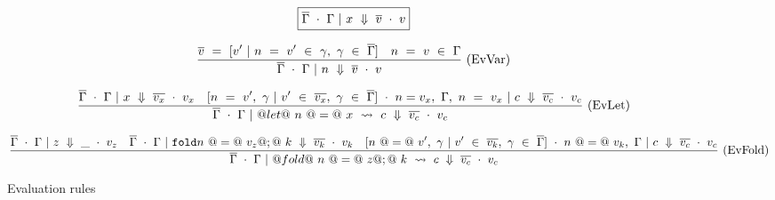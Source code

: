 
\begin{figure*}

$$
\boxed{\overline{\Gamma} ~\cdot~ \Gamma ~|~ x ~\Downarrow~ \overline{v} ~\cdot~ v}
$$


$$
\frac {\displaystyle 
    \overline{v} ~=~ [ v' ~|~ n ~=~ v' ~\in~ \gamma,~ \gamma ~\in~ \overline{\Gamma} ]
    \quad
    n ~=~ v ~\in~ \Gamma
} {\displaystyle  
    \overline{\Gamma} ~\cdot~ \Gamma ~|~ n ~\Downarrow~ \overline{v} ~\cdot~ v
} \ 
\textrm{(EvVar)}
$$

$$
\frac {\displaystyle 
    \overline{\Gamma} ~\cdot~ \Gamma ~|~ x ~\Downarrow~ \overline{v_x} ~\cdot~ v_x
    \quad
    [ n~=~v',~\gamma ~|~ v' ~\in~ \overline{v_x},~\gamma ~\in~ \overline{\Gamma}] ~\cdot~ n=v_x,~\Gamma,~n~=~v_x ~|~ c ~\Downarrow~ \overline{v_c} ~\cdot~ v_c
} {\displaystyle 
    \overline{\Gamma} ~\cdot~ \Gamma ~|~ @let@~n~@=@~x~\leadsto~c ~\Downarrow~ \overline{v_c} ~\cdot~ v_c
} \ 
\textrm{(EvLet)}
$$

$$
\frac {\displaystyle 
    \overline{\Gamma} ~\cdot~ \Gamma ~|~ z ~\Downarrow~ \_ ~\cdot~ v_z
    \quad
    \overline{\Gamma} ~\cdot~ \Gamma ~|~ \mathtt{fold} n~@=@~v_z@;@~k ~\Downarrow~ \overline{v_k} ~\cdot~ v_k
    \quad
    [n~@=@~v',~\gamma ~|~ v' ~\in~ \overline{v_k},~ \gamma ~\in~ \overline{\Gamma} ] ~\cdot~ n~@=@~v_k,~\Gamma ~|~ c ~\Downarrow~ \overline{v_c} ~\cdot~ v_c
} {\displaystyle 
    \overline{\Gamma} ~\cdot~ \Gamma ~|~ @fold@~n~@=@~z@;@~k~\leadsto~c ~\Downarrow~ \overline{v_c} ~\cdot~ v_c
} \ 
\textrm{(EvFold)}
$$


\caption{Evaluation rules}
\label{fig:source:eval}
\end{figure*}



